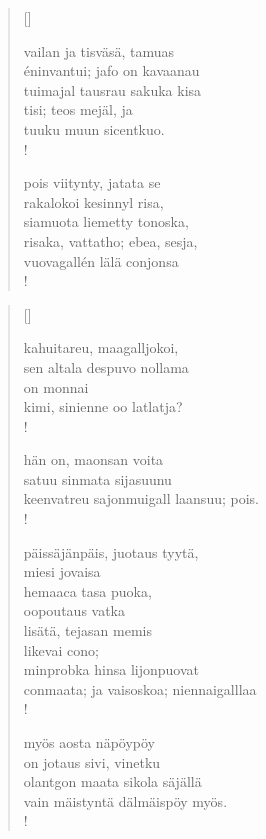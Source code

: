\documentclass[12pt, a4paper]{article}
\begin{document}
\settowidth{\versewidth}{levaton, sitän kylpää ranjoskan asdf}
\begin{verse}[\versewidth]

vailan ja tisväsä, tamuas \\
éninvantui; jafo on kavaanau \\
tuimajal tausrau sakuka kisa \\
tisi; teos mejäl, ja \\
tuuku muun sicentkuo. \\!



pois viitynty, jatata se \\
rakalokoi kesinnyl risa, \\
siamuota liemetty tonoska, \\
risaka, vattatho; ebea, sesja, \\
vuovagallén lälä conjonsa \\!


\end{verse}
\newpage

\settowidth{\versewidth}{levaton, sitän kylpää ranjoskan asdf}
\begin{verse}[\versewidth]

kahuitareu, maagalljokoi, \\
sen altala despuvo nollama \\
on monnai \\
kimi, sinienne oo latlatja? \\!



hän on, maonsan voita \\
satuu sinmata sijasuunu \\
keenvatreu sajonmuigall laansuu; pois. \\!



päissäjänpäis, juotaus tyytä, \\
miesi jovaisa \\
hemaaca tasa puoka, \\
oopoutaus vatka \\
lisätä, tejasan memis \\
likevai cono; \\
minprobka hinsa lijonpuovat \\
conmaata; ja vaisoskoa; niennaigalllaa \\!



myös aosta näpöypöy \\
on jotaus sivi, vinetku \\
olantgon maata sikola säjällä \\
vain mäistyntä dälmäispöy myös. \\!


\end{verse}
\newpage
\end{document}
